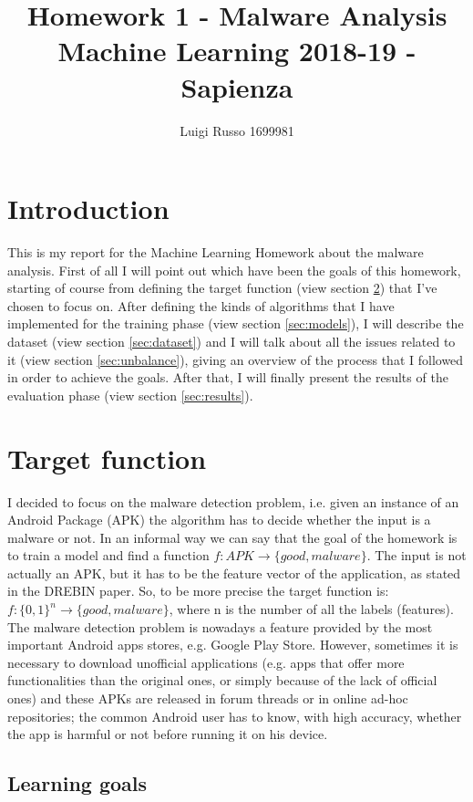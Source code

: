 \documentclass[12pt]{article}
\title{Homework 1 - Malware Analysis\\
	\large Machine Learning 2018-19 - Sapienza}
\author{Luigi Russo 1699981}
\begin{document}
	
\maketitle
\newpage
\tableofcontents
\newpage
\section{Introduction}
This is my report for the Machine Learning Homework about the malware analysis. First of all I will point out which have been the goals of this homework, starting of course from defining the target function (view section \ref{sec:target_function}) that I've chosen to focus on. After defining the kinds of algorithms that I have implemented for the training phase (view section \ref{sec:models}), I will describe the dataset (view section \ref{sec:dataset}) and I will talk about all the issues related to it (view section \ref{sec:unbalance}), giving an overview of the process that I followed in order to achieve the goals. After that, I will finally present the results of the evaluation phase (view section \ref{sec:results}).

\section{Target function}
\label{sec:target_function}
I decided to focus on the malware detection problem, i.e. given an instance of an Android Package (APK) the algorithm has to decide whether the input is a malware or not. In an informal way we can say that the goal of the homework is to train a model and find a function
$ f: APK \rightarrow \{good, malware\} $.
The input is not actually an APK, but it has to be the feature vector of the application, as stated in the DREBIN \cite{DREBIN} paper. So, to be more precise the target function is:
$ f: \{0,1\}^n  \rightarrow \{good, malware\} $, where n is the number of all the labels (features).
The malware detection problem is nowadays a feature provided by the most important Android apps stores, e.g. Google Play Store. However, sometimes it is necessary to download unofficial applications (e.g. apps that offer more functionalities than the original ones, or simply because of the lack of official ones) and these APKs are released in forum threads or in online ad-hoc repositories; the common Android user has to know, with high accuracy, whether the app is harmful or not before running it on his device.

\subsection{Learning goals}
\end{document}
